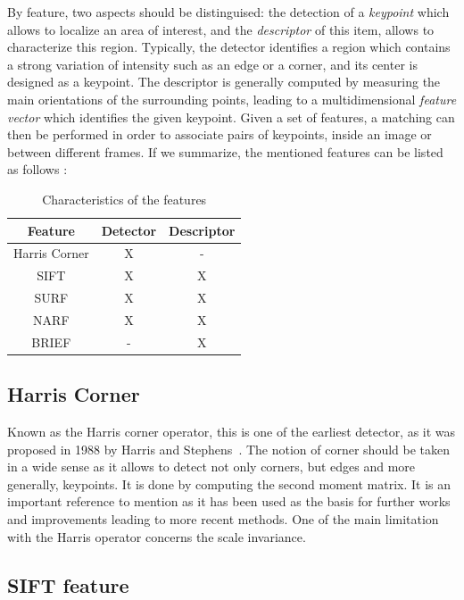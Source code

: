 By feature, two aspects should be distinguised: the detection of a \emph{keypoint} which allows to localize an area of interest, and the \emph{descriptor} of this item, allows to characterize this region. Typically, the detector identifies a region which contains a strong variation of intensity such as an edge or a corner, and its center is designed as a keypoint. The descriptor is generally computed by measuring the main orientations of the surrounding points, leading to a multidimensional \emph{feature vector} which identifies the given keypoint. Given a set of features, a matching can then be performed in order to associate pairs of keypoints, inside an image or between different frames. If we summarize, the mentioned features can be listed as follows :

\begin {table}
 \begin{center}
  \begin{tabular}{c|cc}
  \hline
  Feature & Detector & Descriptor \\
  \hline
  Harris Corner & X & - \\
  SIFT & X & X \\
  SURF & X & X \\
  NARF & X & X \\
  BRIEF & - & X \\
  \hline
  \end{tabular}
 \end{center}
\caption {Characteristics of the features}
\end{table}

\subsection{Harris Corner}

Known as the Harris corner operator, this is one of the earliest detector, as it was proposed in 1988 by Harris and Stephens~\cite{Harris88alvey}. The  notion of corner should be taken in a wide sense as it allows to detect not only corners, but edges and more generally, keypoints. It is done by computing the second moment matrix. It is an important reference to mention as it has been used as the basis for further works and improvements leading to more recent methods. One of the main limitation with the Harris operator concerns the scale invariance.

\subsection{SIFT feature}

